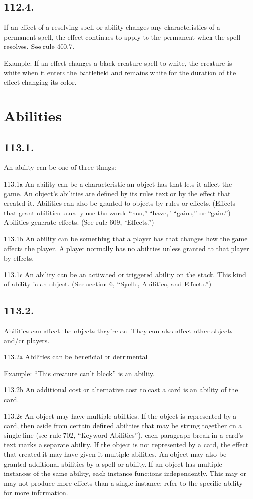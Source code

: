 \subsection*{112.4.}
If an effect of a resolving spell or ability changes any characteristics of a permanent spell, the effect continues to apply to the permanent when the spell resolves. See rule 400.7.

Example: If an effect changes a black creature spell to white, the creature is white when it enters the battlefield and remains white for the duration of the effect changing its color.

\section{Abilities}
\subsection*{113.1.}
An ability can be one of three things:

113.1a An ability can be a characteristic an object has that lets it affect the game. An object’s abilities are defined by its rules text or by the effect that created it. Abilities can also be granted to objects by rules or effects. (Effects that grant abilities usually use the words “has,” “have,” “gains,” or “gain.”) Abilities generate effects. (See rule 609, “Effects.”)

113.1b An ability can be something that a player has that changes how the game affects the player. A player normally has no abilities unless granted to that player by effects.

113.1c An ability can be an activated or triggered ability on the stack. This kind of ability is an object. (See section 6, “Spells, Abilities, and Effects.”)

\subsection*{113.2.}
Abilities can affect the objects they’re on. They can also affect other objects and/or players.

113.2a Abilities can be beneficial or detrimental.

Example: “This creature can’t block” is an ability.

113.2b An additional cost or alternative cost to cast a card is an ability of the card.

113.2c An object may have multiple abilities. If the object is represented by a card, then aside from certain defined abilities that may be strung together on a single line (see rule 702, “Keyword Abilities”), each paragraph break in a card’s text marks a separate ability. If the object is not represented by a card, the effect that created it may have given it multiple abilities. An object may also be granted additional abilities by a spell or ability. If an object has multiple instances of the same ability, each instance functions independently. This may or may not produce more effects than a single instance; refer to the specific ability for more information.

